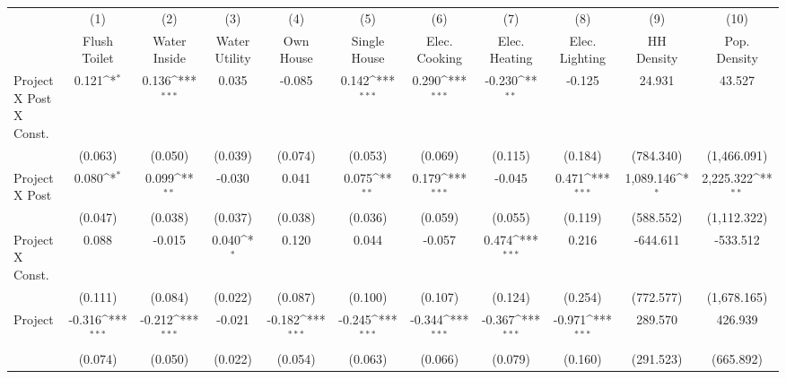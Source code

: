 {
\def\sym#1{\ifmmode^{#1}\else\(^{#1}\)\fi}
\begin{tabular}{l*{10}{c}}
\hline\hline
                &\multicolumn{1}{c}{(1)}&\multicolumn{1}{c}{(2)}&\multicolumn{1}{c}{(3)}&\multicolumn{1}{c}{(4)}&\multicolumn{1}{c}{(5)}&\multicolumn{1}{c}{(6)}&\multicolumn{1}{c}{(7)}&\multicolumn{1}{c}{(8)}&\multicolumn{1}{c}{(9)}&\multicolumn{1}{c}{(10)}\\
                &\multicolumn{1}{c}{Flush Toilet}&\multicolumn{1}{c}{Water Inside}&\multicolumn{1}{c}{Water Utility}&\multicolumn{1}{c}{Own House}&\multicolumn{1}{c}{Single House}&\multicolumn{1}{c}{Elec. Cooking}&\multicolumn{1}{c}{Elec. Heating}&\multicolumn{1}{c}{Elec. Lighting}&\multicolumn{1}{c}{HH Density}&\multicolumn{1}{c}{Pop. Density}\\
\hline
Project X Post X Const.&    0.121\sym{*}  &    0.136\sym{***}&    0.035         &   -0.085         &    0.142\sym{***}&    0.290\sym{***}&   -0.230\sym{**} &   -0.125         &   24.931         &   43.527         \\
                &  (0.063)         &  (0.050)         &  (0.039)         &  (0.074)         &  (0.053)         &  (0.069)         &  (0.115)         &  (0.184)         &(784.340)         &(1,466.091)         \\
[1em]
Project X Post  &    0.080\sym{*}  &    0.099\sym{**} &   -0.030         &    0.041         &    0.075\sym{**} &    0.179\sym{***}&   -0.045         &    0.471\sym{***}&1,089.146\sym{*}  &2,225.322\sym{**} \\
                &  (0.047)         &  (0.038)         &  (0.037)         &  (0.038)         &  (0.036)         &  (0.059)         &  (0.055)         &  (0.119)         &(588.552)         &(1,112.322)         \\
[1em]
Project X Const.&    0.088         &   -0.015         &    0.040\sym{*}  &    0.120         &    0.044         &   -0.057         &    0.474\sym{***}&    0.216         & -644.611         & -533.512         \\
                &  (0.111)         &  (0.084)         &  (0.022)         &  (0.087)         &  (0.100)         &  (0.107)         &  (0.124)         &  (0.254)         &(772.577)         &(1,678.165)         \\
[1em]
Project         &   -0.316\sym{***}&   -0.212\sym{***}&   -0.021         &   -0.182\sym{***}&   -0.245\sym{***}&   -0.344\sym{***}&   -0.367\sym{***}&   -0.971\sym{***}&  289.570         &  426.939         \\
                &  (0.074)         &  (0.050)         &  (0.022)         &  (0.054)         &  (0.063)         &  (0.066)         &  (0.079)         &  (0.160)         &(291.523)         &(665.892)         \\

\end{tabular}}
